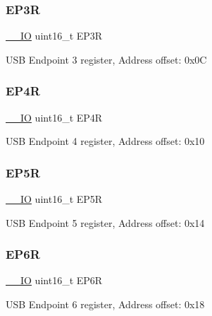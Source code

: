 \subsubsection{\texorpdfstring{E\+P3R}{EP3R}}
{\footnotesize\ttfamily \hyperlink{core__sc300_8h_aec43007d9998a0a0e01faede4133d6be}{\+\_\+\+\_\+\+IO} uint16\+\_\+t E\+P3R}

U\+SB Endpoint 3 register, Address offset\+: 0x0C \mbox{\label{struct_u_s_b___type_def_a304267e30a8fb671cfe22c8ef965d284}} 
\subsubsection{\texorpdfstring{E\+P4R}{EP4R}}
{\footnotesize\ttfamily \hyperlink{core__sc300_8h_aec43007d9998a0a0e01faede4133d6be}{\+\_\+\+\_\+\+IO} uint16\+\_\+t E\+P4R}

U\+SB Endpoint 4 register, Address offset\+: 0x10 \mbox{\label{struct_u_s_b___type_def_a5c7950efccc55900c811a434d259e357}} 
\subsubsection{\texorpdfstring{E\+P5R}{EP5R}}
{\footnotesize\ttfamily \hyperlink{core__sc300_8h_aec43007d9998a0a0e01faede4133d6be}{\+\_\+\+\_\+\+IO} uint16\+\_\+t E\+P5R}

U\+SB Endpoint 5 register, Address offset\+: 0x14 \mbox{\label{struct_u_s_b___type_def_aba6ced7617c465949dc6b9ba64b96ef7}} 
\subsubsection{\texorpdfstring{E\+P6R}{EP6R}}
{\footnotesize\ttfamily \hyperlink{core__sc300_8h_aec43007d9998a0a0e01faede4133d6be}{\+\_\+\+\_\+\+IO} uint16\+\_\+t E\+P6R}

U\+SB Endpoint 6 register, Address offset\+: 0x18 \mbox{\label{struct_u_s_b___type_def_abc8d8ef89e886cc3492e0617bef98edf}} 
